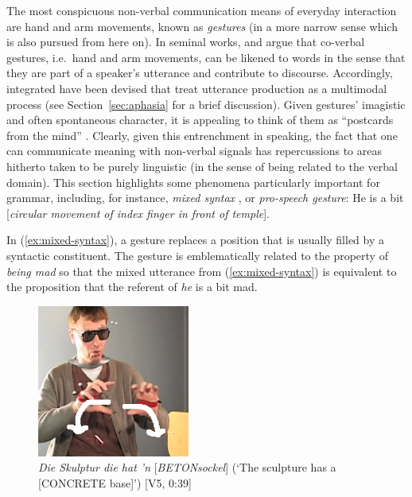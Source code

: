 \documentclass[output=paper
                ,modfonts
                ,nonflat
	        ,collection
	        ,collectionchapter
	        ,collectiontoclongg
 	        ,biblatex
                ,babelshorthands
                ,newtxmath
                ,draftmode
                ,colorlinks, citecolor=brown
]{./langsci/langscibook}
\begin{document}
The most conspicuous non-verbal communication means of everyday interaction are hand and arm movements, known as \emph{gestures} (in a more narrow sense which is also pursued from here on).
%
In seminal works, \citet{McNeill:1985,McNeill:1992} and \citet{Kendon:1980,Kendon:2004} argue that co-verbal gestures, i.e.\ hand and arm movements, can be likened to words in the sense that they are part of a speaker's utterance and contribute to discourse.
%
Accordingly, integrated  have been devised \citep{Kita:Ozyurek:2003,de:Ruiter:2000,Krauss:Chen:Gottesmann:2000} that treat utterance production as a multimodal process (see Section~\ref{sec:aphasia} for a brief discussion).
%
Given gestures' imagistic  and often spontaneous character, it is appealing to think of them as \enquote{postcards from the mind} \citep[21]{de:Ruiter:2007:a}.
%
Clearly, given this entrenchment in speaking, the fact that one can communicate meaning with non-verbal signals has repercussions to areas hitherto taken to be purely linguistic (in the sense of being related to the verbal domain).
%
This section highlights some phenomena particularly important for grammar, including, for instance,  \emph{mixed syntax}  \citep{Slama-Cazacu:1976}, or \emph{pro-speech gesture}: 
%
\ea \label{ex:mixed-syntax}
He is a bit [\textit{circular movement of index finger in front of temple}].
\z

In (\ref{ex:mixed-syntax}), a gesture replaces a position that is usually filled by a syntactic constituent.
%
The gesture is emblematically related to the property of \textit{being mad} so that the mixed utterance from (\ref{ex:mixed-syntax}) is equivalent to the proposition that the referent of \textit{he} is a bit mad.

\begin{figure}
  \centering
  \includegraphics[trim={0 0 0 4cm}, clip, width=5cm]{figures/Betonsockel-1}
  \caption[Sculpture]{\textit{Die Skulptur die hat 'n} [\textit{BETONsockel}] (\enquote*{The sculpture has a [CONCRETE base]}) [V5, 0:39]}
  \label{fig:betonsockel}
\end{figure}
\end{document}
